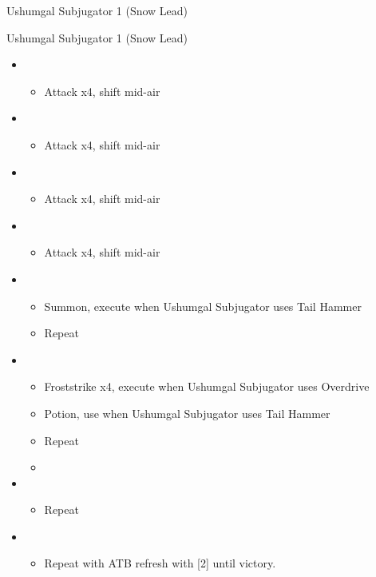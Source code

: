 \begin{paracol}{2}
\begin{battle}{Ushumgal Subjugator 1 (Snow Lead)}
\begin{itemize}
\begin{itemize}
			      \end{itemize}
		\end{itemize}
	\end{battle}
	\switchcolumn
	\begin{battle}{Ushumgal Subjugator 1 (Snow Lead)}
		\begin{itemize}
			\item \first
			      \begin{itemize}
				      \item Attack x4, shift mid-air
			      \end{itemize}
			\item \second
			      \begin{itemize}
				      \item Attack x4, shift mid-air
			      \end{itemize}
			\item \first
			      \begin{itemize}
				      \item Attack x4, shift mid-air
			      \end{itemize}
			\item \second
			      \begin{itemize}
				      \item Attack x4, shift mid-air
			      \end{itemize}
			\item \first
			      \begin{itemize}
				      \item Summon, execute when Ushumgal Subjugator uses Tail Hammer
				      \item Repeat
			      \end{itemize}
			\item \fifth
			      \begin{itemize}
				      \item Froststrike x4, execute when Ushumgal Subjugator uses Overdrive
				      \item Potion, use when Ushumgal Subjugator uses Tail Hammer
				      \item Repeat
				      \item \stagger
			      \end{itemize}
			\item \sixth
			      \begin{itemize}
				      \item Repeat
			      \end{itemize}
			\item \first
			      \begin{itemize}
				      \item Repeat with ATB refresh with [2] until victory.
			      \end{itemize}
		\end{itemize}
	\end{battle}
	\switchcolumn*
	\switchcolumn




\end{paracol}
